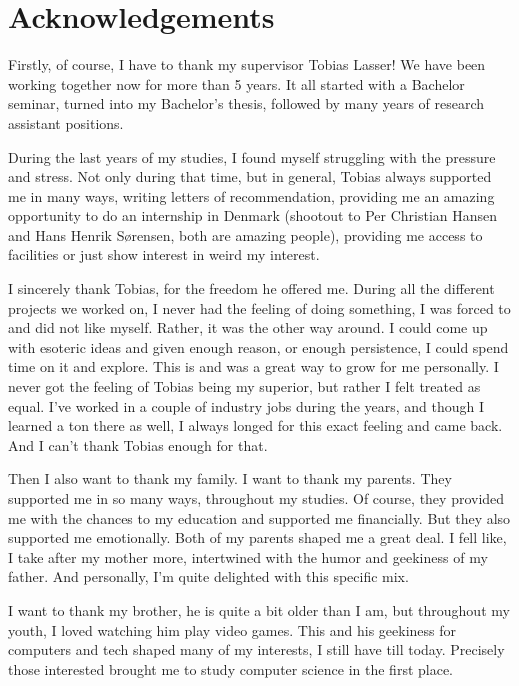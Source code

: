 \thispagestyle{empty}
\chapter*{Acknowledgements}
\noindent%

Firstly, of course, I have to thank my supervisor Tobias Lasser! We have been working together now
for more than 5 years. It all started with a Bachelor seminar, turned into my Bachelor's thesis,
followed by many years of research assistant positions.

During the last years of my studies, I found myself struggling with the pressure and stress. Not
only during that time, but in general, Tobias always supported me in many ways, writing letters of
recommendation, providing me an amazing opportunity to do an internship in Denmark (shootout to Per
Christian Hansen and Hans Henrik Sørensen, both are amazing people), providing me access to
facilities or just show interest in weird my interest.

I sincerely thank Tobias, for the freedom he offered me. During all the different projects we worked
on, I never had the feeling of doing something, I was forced to and did not like myself. Rather, it
was the other way around. I could come up with esoteric ideas and given enough reason, or enough
persistence, I could spend time on it and explore. This is and was a great way to grow for me
personally. I never got the feeling of Tobias being my superior, but rather I felt treated as equal.
I've worked in a couple of industry jobs during the years, and though I learned a ton there as well,
I always longed for this exact feeling and came back. And I can't thank Tobias enough for that.

Then I also want to thank my family. I want to thank my parents. They supported me in so many ways,
throughout my studies. Of course, they provided me with the chances to my education and supported me
financially. But they also supported me emotionally. Both of my parents shaped me a great deal. I
fell like, I take after my mother more, intertwined with the humor and geekiness of my father. And
personally, I'm quite delighted with this specific mix.

I want to thank my brother, he is quite a bit older than I am, but throughout my youth, I loved
watching him play video games. This and his geekiness for computers and tech shaped many of my
interests, I still have till today. Precisely those interested brought me to study computer science
in the first place.

